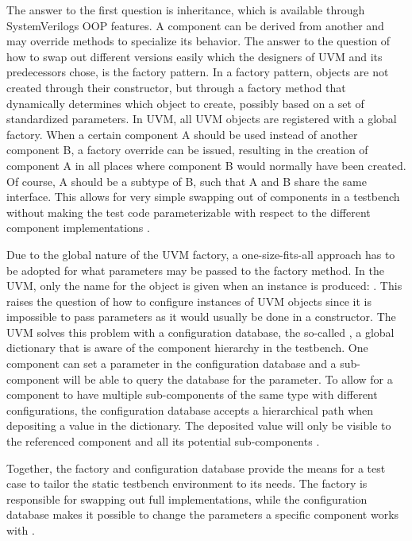 The answer to the first question is inheritance, which is available through SystemVerilogs OOP features. A component
can be derived from another and may override methods to specialize its behavior. The answer to the question of how to
swap out different versions easily which the designers of UVM and its predecessors chose, is the factory pattern. In
a factory pattern, objects are not created through their constructor, but through a factory method that dynamically
determines which object to create, possibly based on a set of standardized parameters. In UVM, all UVM objects are
registered with a global factory. When a certain component A should be used instead of another component B, a factory
override can be issued, resulting in the creation of component A in all places where component B would normally have
been created. Of course, A should be a subtype of B, such that A and B share the same interface. This allows for very
simple swapping out of components in a testbench without making the test code parameterizable with respect to the
different component implementations \cite[Ch. 13]{salemi2013uvm}.

Due to the global nature of the UVM factory, a one-size-fits-all approach has to be adopted for what parameters may be
passed to the factory method. In the UVM, only the name for the object is given when an instance is produced:
. This raises the question of how to configure instances of UVM objects
since it is impossible to pass parameters as it would usually be done in a constructor. The UVM solves this problem
with a configuration database, the so-called , a global dictionary that is aware of the
component hierarchy in the testbench. One component can set a parameter in the configuration database and a
sub-component will be able to query the database for the parameter. To allow for a component to have
multiple sub-components of the same type with different configurations, the configuration database accepts a
hierarchical path when depositing a value in the dictionary. The deposited value will only be visible to the
referenced component and all its potential sub-components \cite{configdb}.

Together, the factory and configuration database provide the means for a test case to tailor the static testbench
environment to its needs. The factory is responsible for swapping out full implementations, while the configuration
database makes it possible to change the parameters a specific component works with \cite[Ch. 4.3]{mehta2018asic}.

